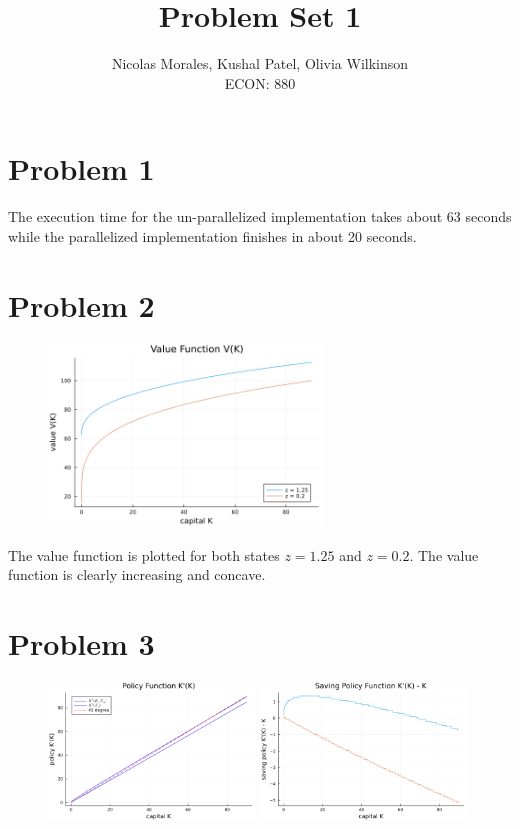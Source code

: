 \documentclass[10pt]{article}
\begin{document}
 
\title{Problem Set 1}
\author{Nicolas Morales, Kushal Patel, Olivia Wilkinson \\
ECON: 880}
\maketitle

\section{Problem 1}

The execution time for the un-parallelized implementation takes about 63 seconds while the parallelized implementation finishes in about 20 seconds. 

\section{Problem 2}
\begin{figure}[!h]
    \centering
    \includegraphics[width = 0.65\textwidth]{Value_Functions.png}
\end{figure}

The value function is plotted for both states $z = 1.25$ and $z = 0.2$. The value function is clearly increasing and concave. 

\newpage 
\section{Problem 3}
\begin{figure}[!h]
    \centering
    \includegraphics[width = 0.49\textwidth]{Policy_Functions.png}
    \includegraphics[width = 0.49\textwidth]{Policy_Functions_Changes.png}

\end{figure}
\end{document}
